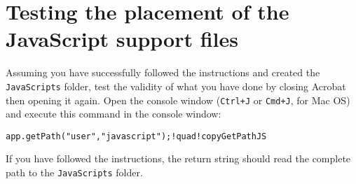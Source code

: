 \documentclass{article}
\def\app#1{\textsf{#1}}
\def\amtIndent{\parindent}
\begin{document}
\section{Testing the placement of the JavaScript support files}

Assuming you have successfully followed the instructions and created the
\texttt{JavaScripts} folder, test the validity of what you have done by
closing \app{Acrobat} then opening it again. Open the console window
(\texttt{Ctrl+J} or \texttt{Cmd+J}, for \app{Mac OS}) and execute this
command in the console window:
\begin{Verbatim}[xleftmargin=\amtIndent,commandchars={!~@}]
app.getPath("user","javascript");!quad!copyGetPathJS
\end{Verbatim}
If you have followed the instructions, the return string should read the
complete path to the \texttt{JavaScripts} folder.
\end{document}
